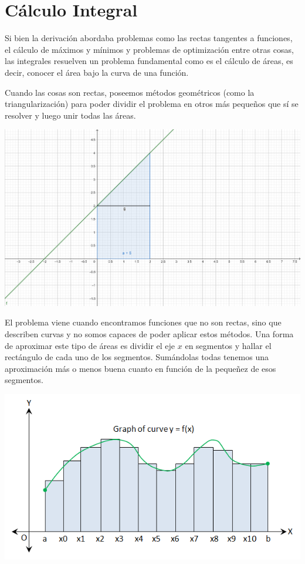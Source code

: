 \documentclass[10pt,a4paper,openright]{book}
\theoremstyle{break}
\begin{document}
\chapter{Cálculo Integral}
Si bien la derivación abordaba problemas como las rectas tangentes a funciones, el cálculo de máximos y mínimos y problemas de optimización entre otras cosas, las integrales resuelven un problema fundamental como es el cálculo de áreas, es decir, conocer el área bajo la curva de una función.

Cuando las cosas son rectas, poseemos métodos geométricos (como la triangularización) para poder dividir el problema en otros más pequeños que sí se resolver y luego unir todas las áreas.

\begin{center}
\includegraphics[scale=0.8]{area facil}
\end{center}

El problema viene cuando encontramos funciones que no son rectas, sino que describen curvas y no somos capaces de poder aplicar estos métodos. Una forma de aproximar este tipo de áreas es dividir el eje $x$ en segmentos y hallar el rectángulo de cada uno de los segmentos. Sumándolas todas tenemos una aproximación más o menos buena cuanto en función de la pequeñez de esos segmentos.

\begin{center}
\includegraphics[scale=0.4]{integral de curvas}
\end{center}
\end{document}
